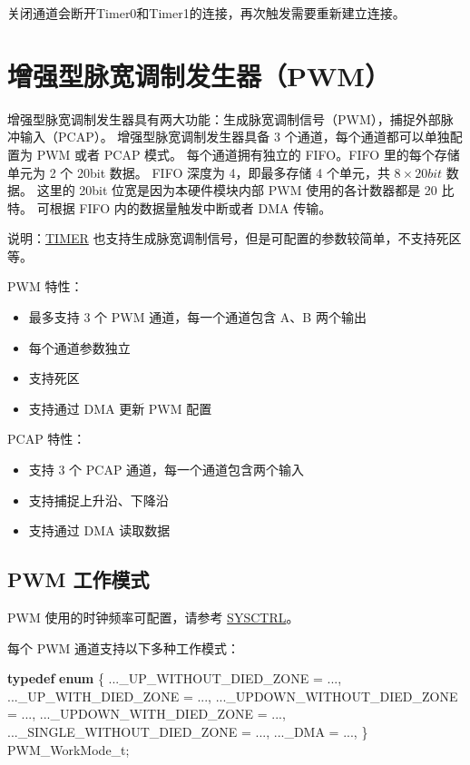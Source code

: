 \documentclass[
  12pt,
]{book}
\newenvironment{Shaded}{\begin{snugshade}}{\end{snugshade}}
\newcommand{\KeywordTok}[1]{\textcolor[rgb]{0.13,0.29,0.53}{\textbf{#1}}}
\newcommand{\NormalTok}[1]{#1}
\providecommand{\tightlist}{%
  \setlength{\itemsep}{0pt}\setlength{\parskip}{0pt}}
\begin{document}
关闭通道会断开Timer0和Timer1的连接，再次触发需要重新建立连接。

\hypertarget{ch-pwm}{%
\chapter{增强型脉宽调制发生器（PWM）}\label{ch-pwm}}

增强型脉宽调制发生器具有两大功能：生成脉宽调制信号（PWM），捕捉外部脉冲输入（PCAP）。
增强型脉宽调制发生器具备 3 个通道，每个通道都可以单独配置为 PWM 或者 PCAP 模式。
每个通道拥有独立的 FIFO。FIFO 里的每个存储单元为 2 个 20bit 数据。
FIFO 深度为 4，即最多存储 4 个单元，共 \(8 \times 20bit\) 数据。
这里的 20bit 位宽是因为本硬件模块内部 PWM 使用的各计数器都是 20 比特。
可根据 FIFO 内的数据量触发中断或者 DMA 传输。

说明：\protect\hyperlink{ch-timer}{TIMER} 也支持生成脉宽调制信号，但是可配置的参数较简单，不支持死区等。

PWM 特性：

\begin{itemize}
\tightlist
\item
  最多支持 3 个 PWM 通道，每一个通道包含 A、B 两个输出
\item
  每个通道参数独立
\item
  支持死区
\item
  支持通过 DMA 更新 PWM 配置
\end{itemize}

PCAP 特性：

\begin{itemize}
\tightlist
\item
  支持 3 个 PCAP 通道，每一个通道包含两个输入
\item
  支持捕捉上升沿、下降沿
\item
  支持通过 DMA 读取数据
\end{itemize}

\hypertarget{pwm-ux5de5ux4f5cux6a21ux5f0f}{%
\section{PWM 工作模式}\label{pwm-ux5de5ux4f5cux6a21ux5f0f}}

PWM 使用的时钟频率可配置，请参考 \protect\hyperlink{ch-sysctrl}{SYSCTRL}。

每个 PWM 通道支持以下多种工作模式：

\begin{Shaded}
\begin{Highlighting}[]
\KeywordTok{typedef} \KeywordTok{enum}
\NormalTok{\{}
\NormalTok{    ..._UP_WITHOUT_DIED_ZONE          = ...,}
\NormalTok{    ..._UP_WITH_DIED_ZONE             = ...,}
\NormalTok{    ..._UPDOWN_WITHOUT_DIED_ZONE      = ...,}
\NormalTok{    ..._UPDOWN_WITH_DIED_ZONE         = ...,}
\NormalTok{    ..._SINGLE_WITHOUT_DIED_ZONE      = ...,}
\NormalTok{    ..._DMA                           = ...,}
\NormalTok{\} PWM_WorkMode_t;}
\end{Highlighting}
\end{Shaded}
\end{document}
